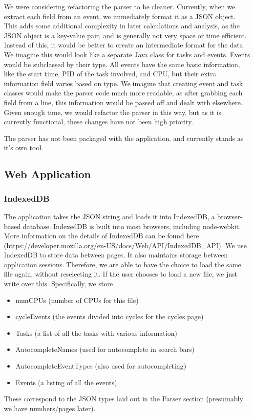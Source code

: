 \documentclass{hmcclinic}
\begin{document}
  We were considering refactoring the parser to be cleaner. Currently, when we
  extract each field from an event, we immediately format it as a JSON object.
  This adds some additional complexity in later calculations and analysis, as
  the JSON object is a key-value pair, and is generally not very space or time
  efficient. Instead of this, it would be better to create an intermediate
  format for the data. We imagine this would look like a separate Java class for
  tasks and events. Events would be subclassed by their type. All events have
  the same basic information, like the start time, PID of the task involved, and
  CPU, but their extra information field varies based on type. We imagine that
  creating event and task classes would make the parser code much more readable,
  as after grabbing each field from a line, this information would be passed off
  and dealt with elsewhere. Given enough time, we would refactor the parser in
  this way, but as it is currently functional, these changes have not been high
  priority.

  The parser has not been packaged with the application, and currently stands as
  it's own tool.

  \subsection{Web Application}

  \subsubsection{IndexedDB}

  The application takes the JSON string and loads it into IndexedDB, a
  browser-based database. IndexedDB is built into most browsers, including
  node-webkit. More information on the details of IndexedDB can be found here
  (https://developer.mozilla.org/en-US/docs/Web/API/IndexedDB\_API).
  We use IndexedDB to store data between pages. It also
  maintains storage between application sessions. Therefore, we are able to have
  the choice to load the same file again, without reselecting it. If the user
  chooses to load a new file, we just write over this.
  Specifically, we store 
  \begin{itemize}
    \item numCPUs (number of CPUs for this file)
    \item cycleEvents (the events divided into cycles for the cycles page)
    \item Tasks (a list of all the tasks with various information)
    \item AutocompleteNames (used for autocomplete in search bars)
    \item AutocompleteEventTypes (also used for autocompleting)
    \item Events (a listing of all the events)
  \end{itemize}
  These correspond to the JSON types laid
  out in the Parser section (presumably we have numbers/pages later).
\end{document}
